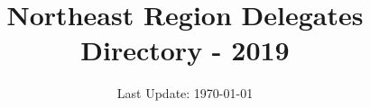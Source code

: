 \documentclass[letterpaper,12pt]{report}
\title{\bf{Northeast Region Delegates Directory - 2019}}
\author{}
\date{Last Update: \today}
\begin{document}
\begin{titlepage}
\maketitle
\end{titlepage}


\end{document}
